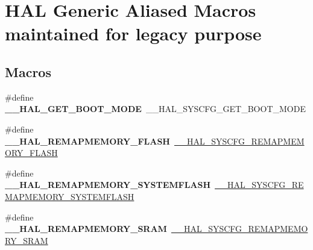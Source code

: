 \hypertarget{group___h_a_l___aliased___macros}{}\section{H\+AL Generic Aliased Macros maintained for legacy purpose}
\label{group___h_a_l___aliased___macros}
\subsection*{Macros}
\begin{DoxyCompactItemize}
\item 
\#define {\bfseries \+\_\+\+\_\+\+H\+A\+L\+\_\+\+G\+E\+T\+\_\+\+B\+O\+O\+T\+\_\+\+M\+O\+DE}~\+\_\+\+\_\+\+H\+A\+L\+\_\+\+S\+Y\+S\+C\+F\+G\+\_\+\+G\+E\+T\+\_\+\+B\+O\+O\+T\+\_\+\+M\+O\+DE\hypertarget{group___h_a_l___aliased___macros_ga39fe1e2b6eddc3101d95ffb9f1fdfc03}{}\label{group___h_a_l___aliased___macros_ga39fe1e2b6eddc3101d95ffb9f1fdfc03}

\item 
\#define {\bfseries \+\_\+\+\_\+\+H\+A\+L\+\_\+\+R\+E\+M\+A\+P\+M\+E\+M\+O\+R\+Y\+\_\+\+F\+L\+A\+SH}~\hyperlink{group___h_a_l___exported___macros_ga9500619e1ec21659bd32b1dfecd5afc1}{\+\_\+\+\_\+\+H\+A\+L\+\_\+\+S\+Y\+S\+C\+F\+G\+\_\+\+R\+E\+M\+A\+P\+M\+E\+M\+O\+R\+Y\+\_\+\+F\+L\+A\+SH}\hypertarget{group___h_a_l___aliased___macros_ga981a56c85b0612c1085c1d84cf879b35}{}\label{group___h_a_l___aliased___macros_ga981a56c85b0612c1085c1d84cf879b35}

\item 
\#define {\bfseries \+\_\+\+\_\+\+H\+A\+L\+\_\+\+R\+E\+M\+A\+P\+M\+E\+M\+O\+R\+Y\+\_\+\+S\+Y\+S\+T\+E\+M\+F\+L\+A\+SH}~\hyperlink{group___h_a_l___exported___macros_ga59782d94690fd538b25def536c81c3ed}{\+\_\+\+\_\+\+H\+A\+L\+\_\+\+S\+Y\+S\+C\+F\+G\+\_\+\+R\+E\+M\+A\+P\+M\+E\+M\+O\+R\+Y\+\_\+\+S\+Y\+S\+T\+E\+M\+F\+L\+A\+SH}\hypertarget{group___h_a_l___aliased___macros_ga476dbd120dafe0fbe3e1e090f85d01ae}{}\label{group___h_a_l___aliased___macros_ga476dbd120dafe0fbe3e1e090f85d01ae}

\item 
\#define {\bfseries \+\_\+\+\_\+\+H\+A\+L\+\_\+\+R\+E\+M\+A\+P\+M\+E\+M\+O\+R\+Y\+\_\+\+S\+R\+AM}~\hyperlink{group___h_a_l___exported___macros_ga86d36fdb1571fd56ffeecfaed80c6805}{\+\_\+\+\_\+\+H\+A\+L\+\_\+\+S\+Y\+S\+C\+F\+G\+\_\+\+R\+E\+M\+A\+P\+M\+E\+M\+O\+R\+Y\+\_\+\+S\+R\+AM}\hypertarget{group___h_a_l___aliased___macros_ga8ac9efd3dae480b2d5d6487ddf0f1750}{}\label{group___h_a_l___aliased___macros_ga8ac9efd3dae480b2d5d6487ddf0f1750}


\end{DoxyCompactItemize}
